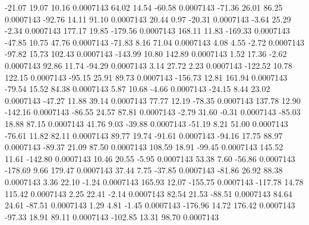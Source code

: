       -21.07       19.07       10.16     0.0007143
       64.02       14.54      -60.58     0.0007143
      -71.36       26.01       86.25     0.0007143
      -92.76       14.11       91.10     0.0007143
       20.44        0.97      -20.31     0.0007143
       -3.64       25.29       -2.34     0.0007143
      177.17       19.85     -179.56     0.0007143
      168.11       11.83     -169.33     0.0007143
      -47.85       10.75       47.76     0.0007143
      -71.83        8.16       71.04     0.0007143
        4.08        4.55       -2.72     0.0007143
      -97.82       15.73      102.43     0.0007143
     -143.99       10.80      142.89     0.0007143
        1.52       17.36       -2.62     0.0007143
       92.86       11.74      -94.29     0.0007143
        3.14       27.72        2.23     0.0007143
     -122.52       10.78      122.15     0.0007143
      -95.15       25.91       89.73     0.0007143
     -156.73       12.81      161.94     0.0007143
      -79.54       15.52       84.38     0.0007143
        5.87       10.68       -4.66     0.0007143
      -24.15        8.44       23.02     0.0007143
      -47.27       11.88       39.14     0.0007143
       77.77       12.19      -78.35     0.0007143
      137.78       12.90     -142.16     0.0007143
      -86.55       24.57       87.81     0.0007143
       -2.79       31.60       -0.31     0.0007143
      -85.03       18.88       87.15     0.0007143
       41.76        9.03      -39.88     0.0007143
      -51.19        8.21       51.00     0.0007143
      -76.61       11.82       82.11     0.0007143
       89.77       19.74      -91.61     0.0007143
      -94.16       17.75       88.97     0.0007143
      -89.37       21.09       87.50     0.0007143
      108.59       18.91      -99.45     0.0007143
      145.52       11.61     -142.80     0.0007143
       10.46       20.55       -5.95     0.0007143
       53.38        7.60      -56.86     0.0007143
     -178.69        9.66      179.47     0.0007143
       37.44        7.75      -37.85     0.0007143
      -81.86       26.92       88.38     0.0007143
        3.36       22.10       -1.24     0.0007143
      165.93       12.07     -155.75     0.0007143
     -117.78       14.78      115.42     0.0007143
        2.25       22.41       -2.14     0.0007143
       82.54       21.53      -88.51     0.0007143
       84.64       24.61      -87.51     0.0007143
        1.29        4.81       -1.45     0.0007143
     -176.96       14.72      176.42     0.0007143
      -97.33       18.91       89.11     0.0007143
     -102.85       13.31       98.70     0.0007143
